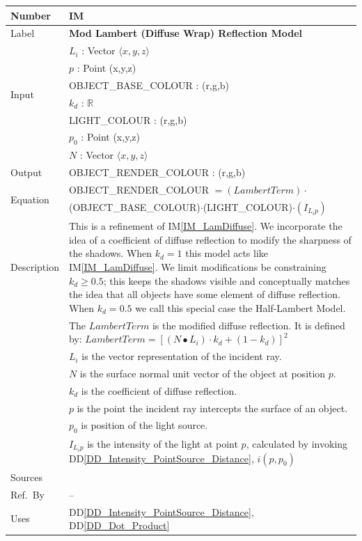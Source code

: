 \documentclass[12pt]{article}
\newcommand{\colAwidth}{0.13\textwidth}
\newcommand{\colBwidth}{0.82\textwidth}
\newcommand{\ddref}[1]{DD\ref{#1}}
\newcounter{instnum} %
\newcommand{\iref}[1]{IM\ref{#1}}
\begin{document}
\noindent
\begin{minipage}{\textwidth}
	\renewcommand*{\arraystretch}{1.5}
	\begin{tabular}{| p{\colAwidth} | p{\colBwidth}|}
		\hline
		\rowcolor[gray]{0.9}
		Number& IM{instnum}\theinstnum \label{IM_HalfLam}\\
		\hline
		Label& \bf Mod Lambert (Diffuse Wrap) Reflection Model\\
		\hline
		\multirow{6}{*}{Input}& $L_{i}$ : Vector $\langle x, y, z \rangle$\\
		& $p$ : Point (x,y,z)\\
		& OBJECT\_BASE\_COLOUR : (r,g,b)\\
		& $k_{d}$ : $\mathbb{R}$ \\
		& LIGHT\_COLOUR : (r,g,b)\\
		& $p_{0}$ : Point (x,y,z) \\
		& $N$ : Vector $\langle x, y ,z \rangle$ \\
		\hline
		Output&  OBJECT\_RENDER\_COLOUR : (r,g,b)\\
		\hline
		\multirow{2}{*}{Equation} & OBJECT\_RENDER\_COLOUR $= 
		(LambertTerm)\cdot$\\
		& (OBJECT\_BASE\_COLOUR)$\cdot$(LIGHT\_COLOUR)$\cdot(I_{L_{i}p})$\\
		\hline
		Description & This is a refinement of \iref{IM_LamDiffuse}. We 
		incorporate the idea of a coefficient of diffuse reflection to modify 
		the sharpness of the shadows. When $k_{d} = 1$ this model acts like 
		\iref{IM_LamDiffuse}. We limit modifications be constraining $k_{d} \ge 
		0.5$; this keeps the shadows visible and conceptually matches the idea 
		that all objects have some element of diffuse reflection. When $k_{d} = 
		0.5$ we call this special case the Half-Lambert Model. \\
		& The $LambertTerm$ is the modified diffuse reflection. It is defined 
		by: $LambertTerm = [(N \bullet L_{i})\cdot k_{d} + (1-k_{d})]^2$\\
		&  $L_{i}$ is the vector representation of the incident 
		ray.\\
		& $N$ is the surface normal unit vector of the object at position 
		$p$. \\
		& $k_{d}$  is the coefficient of diffuse reflection.\\
		& $p$ is the point the incident ray intercepts the surface of an 
		object. \\
		& $p_{0}$ is position of the light source. \\				
		& $I_{L_{i}p}$ is the intensity of the light at point $p$, 
		calculated by invoking \ddref{DD_Intensity_PointSource_Distance}, 
		$i(p, p_{0})$\\
		\hline
		Sources& \cite{Comninos2005,Lengyel2003,shreiner2012} \\
		\hline
		Ref.\ By & -- \\
		\hline
		Uses & \ddref{DD_Intensity_PointSource_Distance}, 
		\ddref{DD_Dot_Product}\\
		\hline
	\end{tabular}
\end{minipage}\\
\end{document}
